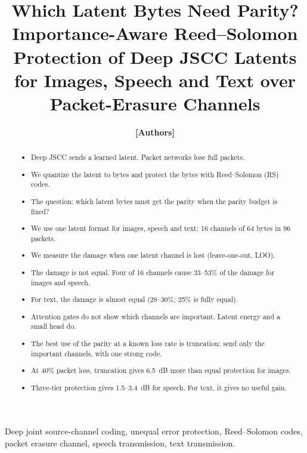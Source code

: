 \documentclass[journal]{IEEEtran}
\providecommand{\TBD}[1]{\textbf{\color{red}[#1]}}
\begin{document}
\title{Which Latent Bytes Need Parity? Importance-Aware Reed--Solomon Protection of Deep JSCC Latents
for Images, Speech and Text over Packet-Erasure Channels}
\author{\TBD{Authors}}
\maketitle

\begin{abstract}
\begin{itemize}
\item Deep JSCC sends a learned latent. Packet networks lose full packets.
\item We quantize the latent to bytes and protect the bytes with Reed--Solomon (RS) codes.
\item The question: which latent bytes must get the parity when the parity budget is fixed?
\item We use one latent format for images, speech and text: 16 channels of 64 bytes in 96 packets.
\item We measure the damage when one latent channel is lost (leave-one-out, LOO).
\item The damage is not equal. Four of 16 channels cause 33--53\% of the damage for images and speech.
\item For text, the damage is almost equal (28--30\%; 25\% is fully equal).
\item Attention gates do not show which channels are important. Latent energy and a small head do.
\item The best use of the parity at a known loss rate is truncation: send only the important channels,
      with one strong code.
\item At 40\% packet loss, truncation gives 6.5~dB more than equal protection for images.
\item Three-tier protection gives 1.5--3.4~dB for speech. For text, it gives no useful gain.
\end{itemize}
\end{abstract}

\begin{IEEEkeywords}
Deep joint source-channel coding, unequal error protection, Reed--Solomon codes, packet erasure channel,
speech transmission, text transmission.
\end{IEEEkeywords}

\end{document}
